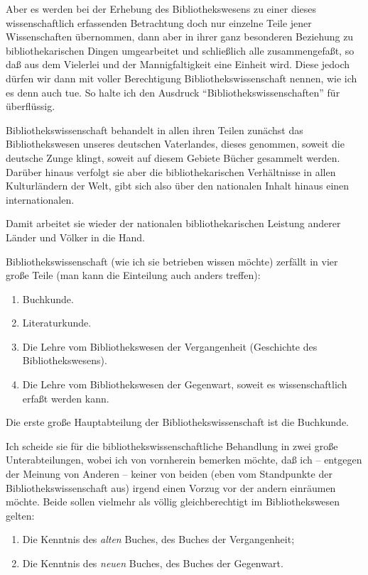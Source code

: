 \documentclass[a4paper,
fontsize=11pt,
oneside,
numbers=noperiodatend,
parskip=half-,
bibliography=totoc,
final
]{scrartcl}
\begin{document}
Aber es werden bei der Erhebung des Bibliothekswesens zu einer dieses
wissenschaftlich erfassenden Betrachtung doch nur einzelne Teile jener
Wissenschaften übernommen, dann aber in ihrer ganz besonderen Beziehung
zu bibliothekarischen Dingen umgearbeitet und schließlich alle
zusammengefaßt, so daß aus dem Vielerlei und der Mannigfaltigkeit eine
Einheit wird. Diese jedoch dürfen wir dann mit voller Berechtigung
Bibliothekswissenschaft nennen, wie ich es denn auch tue. So halte ich
den Ausdruck \enquote{Bibliothekswissenschaften} für überflüssig.

Bibliothekswissenschaft behandelt in allen ihren Teilen zunächst das
Bibliothekswesen unseres deutschen Vaterlandes, dieses genommen, soweit
die deutsche Zunge klingt, soweit auf diesem Gebiete Bücher gesammelt
werden. Darüber hinaus verfolgt sie aber die bibliothekarischen
Verhältnisse in allen Kulturländern der Welt, gibt sich also über den
nationalen Inhalt hinaus einen internationalen.

Damit arbeitet sie wieder der nationalen bibliothekarischen Leistung
anderer Länder und Völker in die Hand.

Bibliothekswissenschaft (wie ich sie betrieben wissen möchte) zerfällt
in vier große Teile (man kann die Einteilung auch anders treffen):

\begin{enumerate}
\def\labelenumi{\Roman{enumi}.}
\item
  Buchkunde.
\item
  Literaturkunde.
\item
  Die Lehre vom Bibliothekswesen der Vergangenheit (Geschichte des
  Bibliothekswesens).
\item
  Die Lehre vom Bibliothekswesen der Gegenwart, soweit es
  wissenschaftlich erfaßt werden kann.
\end{enumerate}

Die erste große Hauptabteilung der Bibliothekswissenschaft ist die
Buchkunde.

Ich scheide sie für die bibliothekswissenschaftliche Behandlung in zwei
große Unterabteilungen, wobei ich von vornherein bemerken möchte, daß
ich -- entgegen der Meinung von Anderen -- keiner von beiden (eben vom
Standpunkte der Bibliothekswissenschaft aus) irgend einen Vorzug vor der
andern einräumen möchte. Beide sollen vielmehr als völlig
gleichberechtigt im Bibliothekswesen gelten:

\begin{enumerate}
\def\labelenumi{\arabic{enumi}.}
\item
  Die Kenntnis des \emph{alten} Buches, des Buches der Vergangenheit;
\item
  Die Kenntnis des \emph{neuen} Buches, des Buches der Gegenwart.
\end{enumerate}
\end{document}
